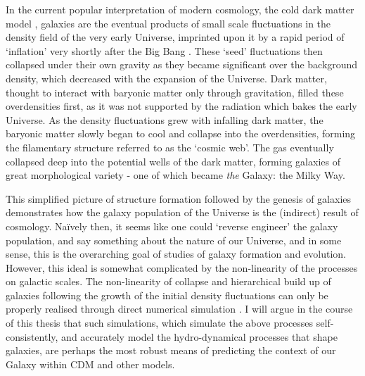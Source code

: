 In the current popular interpretation of modern cosmology, the cold dark matter model \citep[CDM, e.g.][]{1978MNRAS.183..341W}, galaxies are the eventual products of small scale fluctuations in the density field of the very early Universe, imprinted upon it by a rapid period of `inflation' very shortly after the Big Bang \citep{guth1981inflationary}. These `seed' fluctuations then collapsed under their own gravity as they became significant over the background density, which decreased with the expansion of the Universe. Dark matter, thought to interact with baryonic matter only through gravitation, filled these overdensities first, as it was not supported by the radiation which bakes the early Universe. As the density fluctuations grew with infalling dark matter, the baryonic matter slowly began to cool and collapse into the overdensities, forming the filamentary structure referred to as the `cosmic web'. The gas eventually collapsed deep into the potential wells of the dark matter, forming galaxies of great morphological variety - one of which became \emph{the} Galaxy: the Milky Way.

This simplified picture of structure formation followed by the genesis of galaxies demonstrates how the galaxy population of the Universe is the (indirect) result of cosmology. Na\"ively then, it seems like one could `reverse engineer' the galaxy population, and say something about the nature of our Universe, and in some sense, this is the overarching goal of studies of galaxy formation and evolution. However, this ideal is somewhat complicated by the non-linearity of the processes on galactic scales. The non-linearity of collapse and hierarchical build up of galaxies following the growth of the initial density fluctuations can only be properly realised through direct numerical simulation \citep[e.g.][]{2005Natur.435..629S}. I will argue in the course of this thesis that such simulations, which simulate the above processes self-consistently, and accurately model the hydro-dynamical processes that shape galaxies, are perhaps the most robust means of predicting the context of our Galaxy within CDM and other models.

